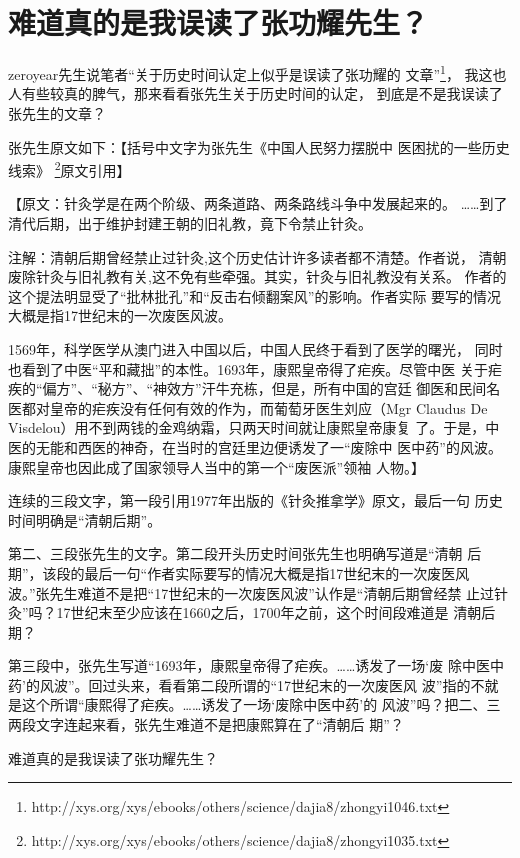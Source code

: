 \chapter{难道真的是我误读了张功耀先生？}

zeroyear先生说笔者“关于历史时间认定上似乎是误读了张功耀的
文章”\footnote{http://xys.org/xys/ebooks/others/science/dajia8/zhongyi1046.txt}，
我这也人有些较真的脾气，那来看看张先生关于历史时间的认定，
到底是不是我误读了张先生的文章？

张先生原文如下：【括号中文字为张先生《中国人民努力摆脱中
医困扰的一些历史线索》
\footnote{http://xys.org/xys/ebooks/others/science/dajia8/zhongyi1035.txt}原文引用】

【原文：\fangsong 针灸学是在两个阶级、两条道路、两条路线斗争中发展起来的。
……到了清代后期，出于维护封建王朝的旧礼教，竟下令禁止针灸。

注解：清朝后期曾经禁止过针灸,这个历史估计许多读者都不清楚。作者说，
清朝废除针灸与旧礼教有关,这不免有些牵强。其实，针灸与旧礼教没有关系。
作者的这个提法明显受了“批林批孔”和“反击右倾翻案风”的影响。作者实际
要写的情况大概是指17世纪末的一次废医风波。

1569年，科学医学从澳门进入中国以后，中国人民终于看到了医学的曙光，
同时也看到了中医“平和藏拙”的本性。1693年，康熙皇帝得了疟疾。尽管中医
关于疟疾的“偏方”、“秘方”、“神效方”汗牛充栋，但是，所有中国的宫廷
御医和民间名医都对皇帝的疟疾没有任何有效的作为，而葡萄牙医生刘应（Mgr
Claudus De Visdelou）用不到两钱的金鸡纳霜，只两天时间就让康熙皇帝康复
了。于是，中医的无能和西医的神奇，在当时的宫廷里边便诱发了一“废除中
医中药”的风波。康熙皇帝也因此成了国家领导人当中的第一个“废医派”领袖
人物。\normalfont 】

连续的三段文字，第一段引用1977年出版的《针灸推拿学》原文，最后一句
历史时间明确是“清朝后期”。

第二、三段张先生的文字。第二段开头历史时间张先生也明确写道是“清朝
后期”，该段的最后一句“作者实际要写的情况大概是指17世纪末的一次废医风
波。”张先生难道不是把“17世纪末的一次废医风波”认作是“清朝后期曾经禁
止过针灸”吗？17世纪末至少应该在1660之后，1700年之前，这个时间段难道是
清朝后期？

第三段中，张先生写道“1693年，康熙皇帝得了疟疾。……诱发了一场‘废
除中医中药’的风波”。回过头来，看看第二段所谓的“17世纪末的一次废医风
波”指的不就是这个所谓“康熙得了疟疾。……诱发了一场‘废除中医中药’的
风波”吗？把二、三两段文字连起来看，张先生难道不是把康熙算在了“清朝后
期”？

难道真的是我误读了张功耀先生？
